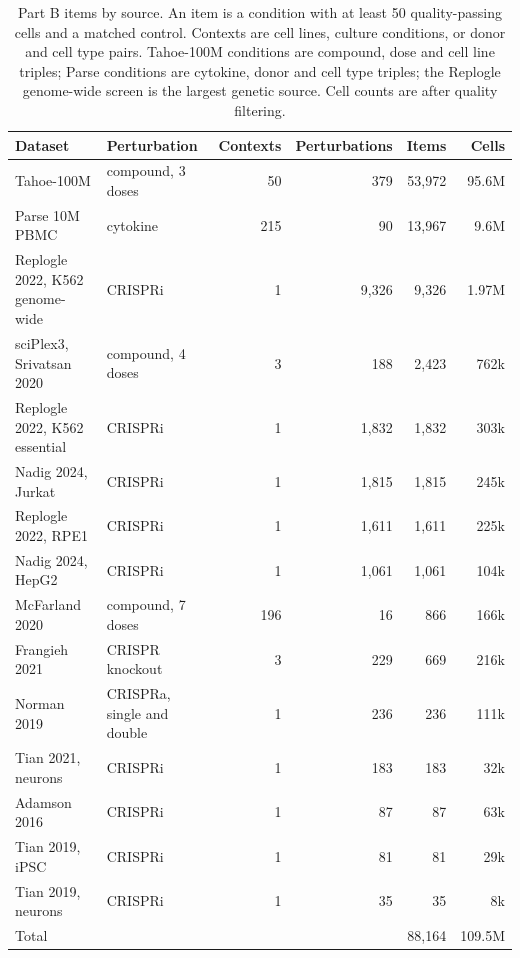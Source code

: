 \documentclass[]{style}
\begin{document}
\begin{table}[t]
\centering
\caption{Part B items by source. An item is a condition with at least 50 quality-passing
cells and a matched control. Contexts are cell lines, culture conditions, or donor and
cell type pairs. Tahoe-100M conditions are compound, dose and cell line triples; Parse
conditions are cytokine, donor and cell type triples; the Replogle genome-wide screen is
the largest genetic source. Cell counts are after quality filtering.}
\label{tab:compB}
\footnotesize
\begin{tabular}{@{}llrrrr@{}}
\toprule
Dataset & Perturbation & Contexts & Perturbations & Items & Cells \\
\midrule
Tahoe-100M & compound, 3 doses & 50 & 379 & 53,972 & 95.6M \\
Parse 10M PBMC & cytokine & 215 & 90 & 13,967 & 9.6M \\
Replogle 2022, K562 genome-wide & CRISPRi & 1 & 9,326 & 9,326 & 1.97M \\
sciPlex3, Srivatsan 2020 & compound, 4 doses & 3 & 188 & 2,423 & 762k \\
Replogle 2022, K562 essential & CRISPRi & 1 & 1,832 & 1,832 & 303k \\
Nadig 2024, Jurkat & CRISPRi & 1 & 1,815 & 1,815 & 245k \\
Replogle 2022, RPE1 & CRISPRi & 1 & 1,611 & 1,611 & 225k \\
Nadig 2024, HepG2 & CRISPRi & 1 & 1,061 & 1,061 & 104k \\
McFarland 2020 & compound, 7 doses & 196 & 16 & 866 & 166k \\
Frangieh 2021 & CRISPR knockout & 3 & 229 & 669 & 216k \\
Norman 2019 & CRISPRa, single and double & 1 & 236 & 236 & 111k \\
Tian 2021, neurons & CRISPRi & 1 & 183 & 183 & 32k \\
Adamson 2016 & CRISPRi & 1 & 87 & 87 & 63k \\
Tian 2019, iPSC & CRISPRi & 1 & 81 & 81 & 29k \\
Tian 2019, neurons & CRISPRi & 1 & 35 & 35 & 8k \\
\midrule
Total & & & & 88,164 & 109.5M \\
\bottomrule
\end{tabular}
\end{table}
\end{document}
